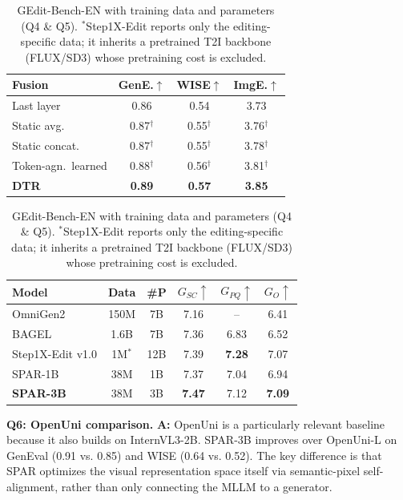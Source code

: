 \documentclass[10pt,twocolumn,letterpaper]{article}
\newcommand{\Rthree}[1]{\textcolor{rThreeColor}{#1}}
\newcommand{\Qtext}[1]{\textcolor{questionColor}{#1}}
\begin{document}
\begin{table}[h]
\footnotesize
\begin{minipage}[t]{0.36\linewidth}
\centering
\setlength{\tabcolsep}{3pt}
\begin{tabular}{lccc}
\toprule
Fusion & GenE.$\uparrow$ & WISE$\uparrow$ & ImgE.$\uparrow$ \\
\midrule
Last layer             & 0.86 & 0.54 & 3.73 \\
Static avg.            & 0.87$^\dagger$ & 0.55$^\dagger$ & 3.76$^\dagger$ \\
Static concat.         & 0.87$^\dagger$ & 0.55$^\dagger$ & 3.78$^\dagger$ \\
Token-agn.\ learned    & 0.88$^\dagger$ & 0.56$^\dagger$ & 3.81$^\dagger$ \\
\textbf{DTR}           & \textbf{0.89} & \textbf{0.57} & \textbf{3.85} \\
\bottomrule
\end{tabular}
\caption{DTR vs.\ multi-layer fusion on SPAR-1B (Q2). $^\dagger$running.}
\label{tab:dtr}
\end{minipage}
\hfill
\begin{minipage}[t]{0.60\linewidth}
\centering
\setlength{\tabcolsep}{3pt}
\begin{tabular}{lccccc}
\toprule
Model & Data & \#P & $G_{SC}\uparrow$ & $G_{PQ}\uparrow$ & $G_{O}\uparrow$ \\
\midrule
OmniGen2         & 150M & 7B  & 7.16 & --   & 6.41 \\
BAGEL            & 1.6B & 7B  & 7.36 & 6.83 & 6.52 \\
Step1X-Edit v1.0 & 1M$^\ast$ & 12B & 7.39 & \textbf{7.28} & 7.07 \\
SPAR-1B          & 38M  & 1B  & 7.37 & 7.04 & 6.94 \\
\textbf{SPAR-3B} & 38M  & 3B  & \textbf{7.47} & 7.12 & \textbf{7.09} \\
\bottomrule
\end{tabular}
\caption{GEdit-Bench-EN with training data and parameters (Q4 \& Q5). $^\ast$Step1X-Edit reports only the editing-specific data; it inherits a pretrained T2I backbone (FLUX/SD3) whose pretraining cost is excluded.}
\label{tab:gedit}
\end{minipage}
\end{table}

\noindent[\textit{\Rthree{umgx}}.] \textbf{\Qtext{Q6: OpenUni comparison.}} \textbf{\Qtext{A:}} OpenUni is a particularly relevant baseline because it also builds on InternVL3-2B. SPAR-3B improves over OpenUni-L on GenEval (0.91 vs. 0.85) and WISE (0.64 vs. 0.52). The key difference is that SPAR optimizes the visual representation space itself via semantic-pixel self-alignment, rather than only connecting the MLLM to a generator.
\end{document}
